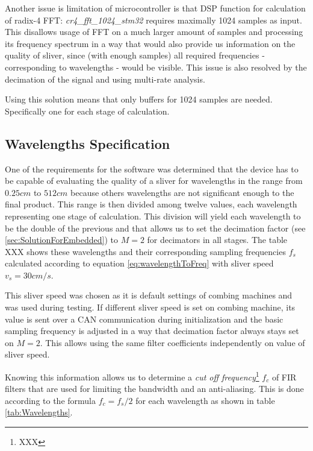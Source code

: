 \documentclass[twoside]{ctuthesis}
\theoremstyle{plain}
\theoremstyle{definition}
\theoremstyle{note}
\begin{document}
Another issue is limitation of microcontroller is that DSP function for calculation of radix-4 FFT: \textit{cr4\_fft\_1024\_stm32} requires maximally 1024 samples as input. This disallows usage of FFT on a much larger amount of samples and processing its frequency spectrum in a way that would also provide us information on the quality of sliver, since (with enough samples) all required frequencies - corresponding to wavelengths - would be visible. This issue is also resolved by the decimation of the signal and using multi-rate analysis. 

Using this solution means that only buffers for 1024 samples are needed. Specifically one for each stage of calculation.

\subsection{Wavelengths Specification}
\label{sec:WavelengthSpecification}
One of the requirements for the software was determined that the device has to be capable of evaluating the quality of a sliver for wavelengths in the range from $0.25 cm$ to $512 cm$ because others wavelengths are not significant enough to the final product. This range is then divided among twelve values, each wavelength representing one stage of calculation. This division will yield each wavelength to be the double of the previous and that allows us to set the decimation factor (see \ref{sec:SolutionForEmbedded}) to $M=2$ for decimators in all stages. The table XXX shows these wavelengths and their corresponding sampling frequencies $f_s$ calculated according to equation \ref{eq:wavelengthToFreq} with sliver speed $v_{s}=30 cm/s$. 

This sliver speed was chosen as it is default settings of combing machines and was used during testing. If different sliver speed is set on combing machine, its value is sent over a CAN communication during initialization and the basic sampling frequency is adjusted in a way that decimation factor always stays set on $M=2$. This allows using the same filter coefficients independently on value of sliver speed.

Knowing this information allows us to determine a \textit{cut off frequency}\footnote{XXX} $f_c$ of FIR filters that are used for limiting the bandwidth and an anti-aliasing. This is done according to the formula $f_c=f_s/2$ for each wavelength as shown in table \ref{tab:Wavelengths}.
\end{document}
